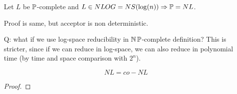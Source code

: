 \begin{consequence}
	Let $L$ be $\operatorname{\mathbb{P}}$-complete and $L \in NLOG = NS(\log(n)) \Rightarrow \operatorname{\mathbb{P}} = NL$.

	Proof is same, but acceptor is non deterministic.
\end{consequence}

Q: what if we use log-space reducibility in $\operatorname{\operatorname{\mathbb{N}}\mathbb{P}}$-complete definition?
This is stricter, since if we can reduce in log-space, we can also reduce in polynomial time (by time and space comparison with $2^n$).

\begin{theorem}
	\[NL = co-NL \]
\end{theorem}
\begin{proof}
\end{proof}
